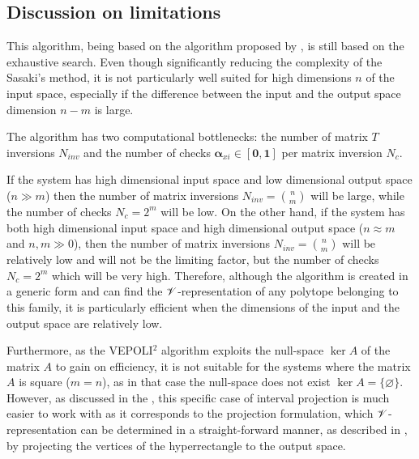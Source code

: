 \subsection{Discussion on limitations}
This algorithm, being based on the algorithm proposed by \citet{sasaki2011vertex}, is still based on the exhaustive search. Even though significantly reducing the complexity of the Sasaki's method, it is not particularly well suited for high dimensions $n$ of the input space, especially if the difference between the input and the output space dimension $n\!-\!m$ is large. 

The algorithm has two computational bottlenecks: the number of matrix $T$ inversions $N_{inv}$ and the number of checks $\bm{\alpha}_{xi} \in [\bm{0},\bm{1}]$ per matrix inversion $N_c$.

If the system has high dimensional input space and low dimensional output space ($n\gg m$) then the number of matrix inversions $N_{inv}=\binom{n}{m}$ will be large, while the number of checks $N_c=2^m$  will be low. 
On the other hand, if the system has both high dimensional input space and high dimensional output space ($n\approx m$ and $n,m\gg0$), then the number of matrix inversions $N_{inv}=\binom{n}{m}$ will be relatively low and will not be the limiting factor, but the number of checks $N_c=2^m$ which will be very high. Therefore, although the algorithm is created in a generic form and can find the $\mathscr{V}$-representation of any polytope belonging to this family, it is particularly efficient when the dimensions of the input and the output space are relatively low. 

Furthermore, as the VEPOLI$^2$ algorithm exploits the null-space $\ker{A}$ of the matrix $A$ to gain on efficiency, it is not suitable for the systems where the matrix $A$ is square ($m\!=\!n$), as in that case the null-space does not exist $\ker{A}=\{\varnothing\}$. However, as discussed in the , this specific case of interval projection is much easier to work with as it corresponds to the projection formulation, which $\mathscr{V}$-representation can be determined in a straight-forward manner, as described in , by projecting the vertices of the hyperrectangle to the output space.


